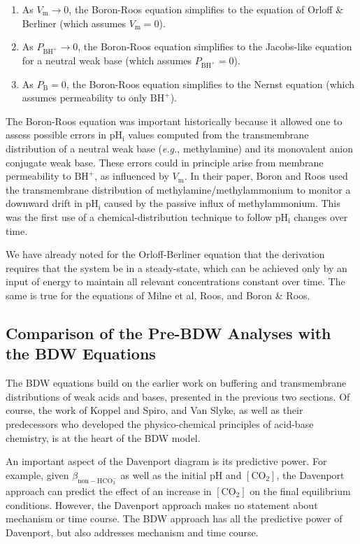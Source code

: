 \documentclass[fleqn,10pt]{physiome}
\begin{document}
\begin{enumerate}[noitemsep] 
\item As $V_\mathrm{m} \rightarrow 0$, the Boron-Roos equation simplifies to the equation of Orloff \& Berliner (which assumes $V_\mathrm{m}=0$).
\item As $P_\mathrm{BH^+} \rightarrow 0$, the Boron-Roos equation simplifies to the Jacobs-like equation for a neutral weak base (which assumes $P_\mathrm{BH^+}=0$).
\item As $P_\mathrm{B}=0$, the Boron-Roos equation simplifies to the Nernst equation (which assumes permeability to only $\mathrm{BH^+}$).
\end{enumerate}

The Boron-Roos equation was important historically because it allowed one to assess possible errors in $\mathrm{pH_i}$ values computed from the transmembrane distribution of a neutral weak base (\emph{e.g.}, methylamine) and its monovalent anion conjugate weak base. These errors could in principle arise from membrane permeability to $\mathrm{BH^+}$, as influenced by $V_\mathrm{m}$. In their paper, Boron and Roos used the transmembrane distribution of methylamine/methylammonium to monitor a downward drift in $\mathrm{pH_i}$ caused by the passive influx of methylammonium. This was the first use of a chemical-distribution technique to follow $\mathrm{pH_i}$ changes over time.

We have already noted for the Orloff-Berliner equation that the derivation requires that the system be in a steady-state, which can be achieved only by an input of energy to maintain all relevant concentrations constant over time. The same is true for the equations of Milne et al, Roos, and Boron \& Roos.

\subsection{Comparison of the Pre-BDW Analyses with the BDW Equations}

The BDW equations build on the earlier work on buffering and transmembrane distributions of weak acids and bases, presented in the previous two sections. Of course, the work of Koppel and Spiro, and Van Slyke, as well as their predecessors who developed the physico-chemical principles of acid-base chemistry, is at the heart of the BDW model.

An important aspect of the Davenport diagram is its predictive power. For example, given $\beta_\mathrm{non-HCO_3^-}$ as well as the initial $\mathrm{pH}$ and $\mathrm{[CO_2]}$, the Davenport approach can predict the effect of an increase in $\mathrm{[CO_2]}$ on the final equilibrium conditions. However, the Davenport approach makes no statement about mechanism or time course. The BDW approach has all the predictive power of Davenport, but also addresses mechanism and time course.
\end{document}
